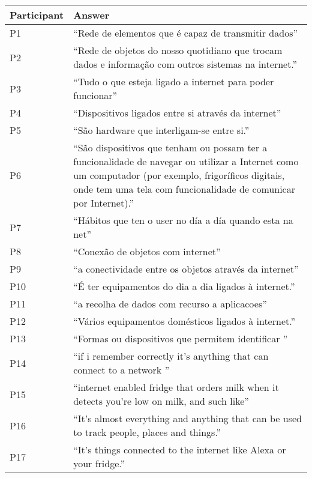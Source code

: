 \begin{table}[H]
    \centering
    \begin{tabular}{p{3cm} p{12cm}}
        \hline
        \textbf{Participant} & \textbf{Answer} \\
        \hline
        P1 & ``Rede de elementos que é capaz de transmitir dados'' \\
        \hline
        P2 & ``Rede de objetos do nosso quotidiano que trocam dados e informação com outros sistemas na internet.'' \\
        \hline
        P3 & ``Tudo o que esteja ligado a internet para poder funcionar'' \\
        \hline
        P4 & ``Dispositivos ligados entre si através da internet'' \\
        \hline
        P5 & ``São hardware que interligam-se entre si.'' \\
        \hline
        P6 & ``São dispositivos que tenham ou possam ter a funcionalidade de navegar ou utilizar a Internet como um computador (por exemplo, frigoríficos digitais, onde tem uma tela com funcionalidade de comunicar por Internet).'' \\
        \hline
        P7 & ``Hábitos que ten o user no día a día quando esta na net'' \\
        \hline
        P8 & ``Conexão de objetos com internet'' \\
        \hline
        P9 & ``a conectividade entre os objetos através da internet'' \\
        \hline
        P10 & ``É ter equipamentos do dia a dia ligados à internet.'' \\
        \hline
        P11 & ``a recolha  de dados com recurso a aplicacoes'' \\
        \hline
        P12 & ``Vários equipamentos domésticos ligados à internet.'' \\
        \hline
        P13 & ``Formas ou dispositivos que permitem identificar '' \\
        \hline
        P14 & ``if i remember correctly it's anything that can connect to a network '' \\
        \hline
        P15 & ``internet enabled fridge that orders milk when it detects you're low on milk, and such like'' \\
        \hline
        P16 & ``It's almost everything and anything that can be used to track people, places and things.'' \\
        \hline
        P17 & ``It's things connected to the internet like Alexa or your fridge.'' \\

\end{tabular}
\end{table}

